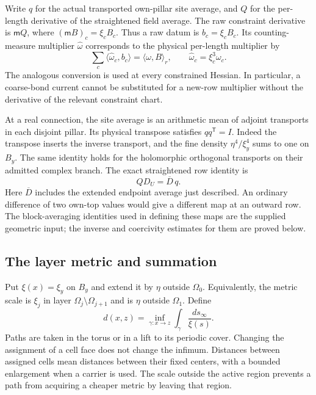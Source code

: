 \documentclass[11pt,letterpaper,reqno]{amsart}
\numberwithin{equation}{section}
\theoremstyle{definition}
\theoremstyle{remark}
\begin{document}
Write $q$ for the actual transported own-pillar site average,
and $Q$ for the per-length derivative of the straightened field
average. The raw constraint derivative is $\mathsf mQ$, where
$(\mathsf mB)_c=\xi_cB_c$. Thus a raw datum is $b_c=\xi_cB_c$.
Its counting-measure multiplier $\widehat\omega$ corresponds to
the physical per-length multiplier by
\begin{equation}\label{mb:raw-duality}
 \sum_c\langle\widehat\omega_c,b_c\rangle
       =\langle\omega,B\rangle_r,
 \qquad \widehat\omega_c=\xi_c^3\omega_c.
\end{equation}
The analogous conversion is used at every constrained Hessian.
In particular, a coarse-bond current cannot be substituted for
a new-row multiplier without the derivative of the relevant
constraint chart.

At a real connection, the site average is an arithmetic mean
of adjoint transports in each disjoint pillar. Its physical
transpose satisfies $qq^{\mathsf T}=I$. Indeed the transpose
inserts the inverse transport, and the fine density
$\eta^4/\xi_y^4$ sums to one on $B_y$. The same identity holds
for the holomorphic orthogonal transports on their admitted
complex branch. The exact straightened row identity is
\begin{equation}\label{mb:extended-gradient-identity}
                       QD_U=\overline D\,q.
\end{equation}
Here $\overline D$ includes the extended endpoint average just
described. An ordinary difference of two own-top values would
give a different map at an outward row. The block-averaging
identities used in defining these maps are the supplied geometric
input; the inverse and coercivity estimates for them are proved
below.

\subsection{The layer metric and summation}

Put $\xi(x)=\xi_y$ on $B_y$ and extend it by $\eta$ outside
$\Omega_0$. Equivalently, the metric scale is $\xi_j$ in layer
$\Omega_j\setminus\Omega_{j+1}$ and is $\eta$ outside
$\Omega_1$. Define
\begin{equation}\label{mb:metric}
 d(x,z)=\inf_{\gamma:x\to z}\int_\gamma\frac{ds_\infty}{\xi(s)}.
\end{equation}
Paths are taken in the torus or in a lift to its periodic cover.
Changing the assignment of a cell face does not change the
infimum. Distances between assigned cells mean distances between
their fixed centers, with a bounded enlargement when a carrier
is used. The scale outside the active region prevents a path
from acquiring a cheaper metric by leaving that region.
\end{document}
